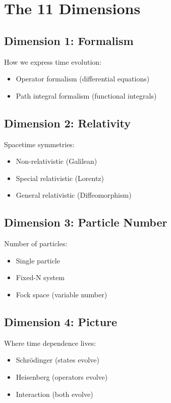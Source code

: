 \documentclass[12pt]{book}
\begin{document}
\section{The 11 Dimensions}

\subsection{Dimension 1: Formalism}

How we express time evolution:
\begin{itemize}
  \item Operator formalism (differential equations)
  \item Path integral formalism (functional integrals)
\end{itemize}

\subsection{Dimension 2: Relativity}

Spacetime symmetries:
\begin{itemize}
  \item Non-relativistic (Galilean)
  \item Special relativistic (Lorentz)
  \item General relativistic (Diffeomorphism)
\end{itemize}

\subsection{Dimension 3: Particle Number}

Number of particles:
\begin{itemize}
  \item Single particle
  \item Fixed-N system
  \item Fock space (variable number)
\end{itemize}

\subsection{Dimension 4: Picture}

Where time dependence lives:
\begin{itemize}
  \item Schrödinger (states evolve)
  \item Heisenberg (operators evolve)
  \item Interaction (both evolve)
\end{itemize}
\end{document}

